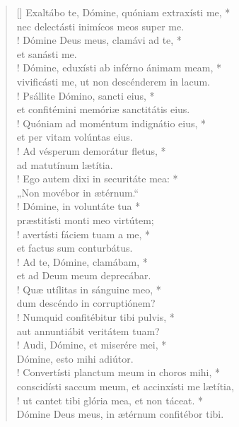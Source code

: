 \begin{verse}[\versewidth]
Exaltábo te, Dómine, quóniam extraxísti me, *\\
nec delectásti inimícos meos super me.\\!
\vin Dómine Deus meus, clamávi ad te, *\\
\vin et sanásti me.\\!
Dómine, eduxísti ab inférno ánimam meam, *\\
vivificásti me, ut non descénderem in lacum.\\!
\vin Psállite Dómino, sancti eius, *\\
\vin et confitémini memóriæ sanctitátis eius.\\!
Quóniam ad moméntum indignátio eius, *\\
et per vitam volúntas eius.\\!
\vin Ad vésperum demorátur fletus, *\\
\vin ad matutínum lætítia.\\!
Ego autem dixi in securitáte mea: *\\
„Non movébor in ætérnum.“\\!
\vin Dómine, in voluntáte tua *\\
\vin præstitísti monti meo virtútem;\\!
avertísti fáciem tuam a me, *\\
et factus sum conturbátus.\\!
\vin Ad te, Dómine, clamábam, *\\
\vin et ad Deum meum deprecábar.\\!
Quæ utílitas in sánguine meo, *\\
dum descéndo in corruptiónem?\\!
\vin Numquid confitébitur tibi pulvis, *\\
\vin aut annuntiábit veritátem tuam?\\!
Audi, Dómine, et miserére mei, *\\
Dómine, esto mihi adiútor.\\!
\vin Convertísti planctum meum in choros mihi, *\\
\vin conscidísti saccum meum, et accinxísti me lætítia,\\!
ut cantet tibi glória mea, et non táceat. *\\
Dómine Deus meus, in ætérnum confitébor tibi.\\
\end{verse}
\vspace{1cm}


